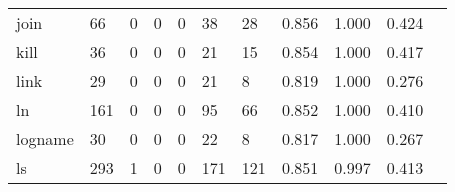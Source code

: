 \begin{longtable}{lp{1.2cm}p{1.2cm}p{1.2cm}p{1.2cm}p{1.2cm}p{1.2cm}p{1.2cm}p{1.2cm}p{1.2cm}p{1.2cm}}
join      &                                    66 &                                                  0 &                                                  0 &                                                  0 &                                                 38 &                                                 28 &                                         0.856 &                                              1.000 &                                              0.424 \\
kill      &                                    36 &                                                  0 &                                                  0 &                                                  0 &                                                 21 &                                                 15 &                                         0.854 &                                              1.000 &                                              0.417 \\
link      &                                    29 &                                                  0 &                                                  0 &                                                  0 &                                                 21 &                                                  8 &                                         0.819 &                                              1.000 &                                              0.276 \\
ln        &                                   161 &                                                  0 &                                                  0 &                                                  0 &                                                 95 &                                                 66 &                                         0.852 &                                              1.000 &                                              0.410 \\
logname   &                                    30 &                                                  0 &                                                  0 &                                                  0 &                                                 22 &                                                  8 &                                         0.817 &                                              1.000 &                                              0.267 \\
ls        &                                   293 &                                                  1 &                                                  0 &                                                  0 &                                                171 &                                                121 &                                         0.851 &                                              0.997 &                                              0.413 \\

\end{longtable}
